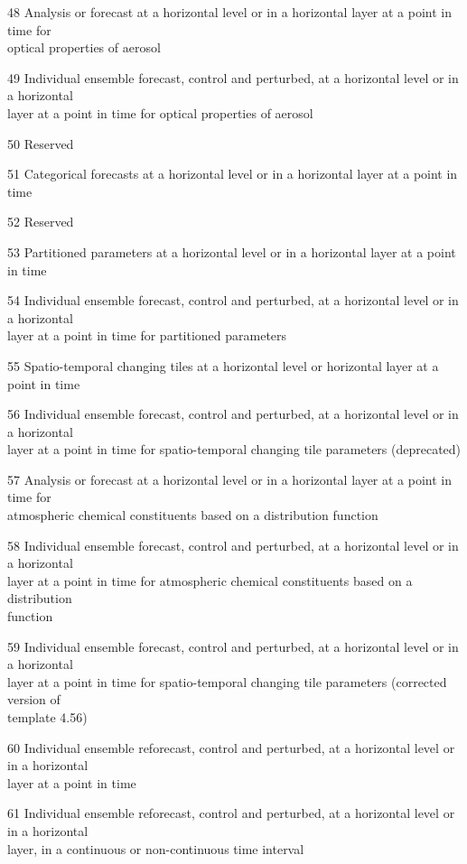 48 Analysis or forecast at a horizontal level or in a horizontal layer at a point in time for\\
optical properties of aerosol

49 Individual ensemble forecast, control and perturbed, at a horizontal level or in a horizontal\\
layer at a point in time for optical properties of aerosol

50 Reserved

51 Categorical forecasts at a horizontal level or in a horizontal layer at a point in time

52 Reserved

53 Partitioned parameters at a horizontal level or in a horizontal layer at a point in time

54 Individual ensemble forecast, control and perturbed, at a horizontal level or in a horizontal\\
layer at a point in time for partitioned parameters

55 Spatio-temporal changing tiles at a horizontal level or horizontal layer at a point in time

56 Individual ensemble forecast, control and perturbed, at a horizontal level or in a horizontal\\
layer at a point in time for spatio-temporal changing tile parameters (deprecated)

57 Analysis or forecast at a horizontal level or in a horizontal layer at a point in time for\\
atmospheric chemical constituents based on a distribution function

58 Individual ensemble forecast, control and perturbed, at a horizontal level or in a horizontal\\
layer at a point in time for atmospheric chemical constituents based on a distribution\\
function

59 Individual ensemble forecast, control and perturbed, at a horizontal level or in a horizontal\\
layer at a point in time for spatio-temporal changing tile parameters (corrected version of\\
template 4.56)

60 Individual ensemble reforecast, control and perturbed, at a horizontal level or in a horizontal\\
layer at a point in time

61 Individual ensemble reforecast, control and perturbed, at a horizontal level or in a horizontal\\
layer, in a continuous or non-continuous time interval

